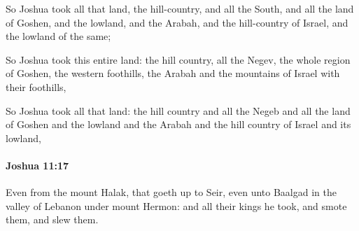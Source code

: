 			\begin{versebox}
					\item[BHS] 
					\item[ASV] So Joshua took all that land, the hill-country, and all the South, and all the land of Goshen, and the lowland, and the Arabah, and the hill-country of Israel, and the lowland of the same;
					\item[NIV] So Joshua took this entire land: the hill country, all the Negev, the whole region of Goshen, the western foothills, the Arabah and the mountains of Israel with their foothills,
					\item[NRSV] So Joshua took all that land: the hill country and all the Negeb and all the land of Goshen and the lowland and the Arabah and the hill country of Israel and its lowland,
			\end{versebox}

		\paragraph{Joshua 11:17} %
			\label{JOSHUA-11-17}

			Even from the mount Halak, that goeth up to Seir, even unto Baalgad in the valley of Lebanon under mount Hermon: and all their kings he took, and smote them, and slew them.

